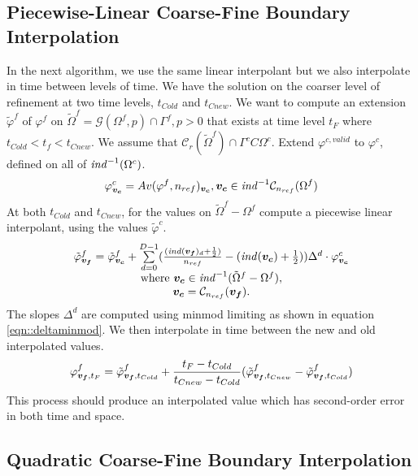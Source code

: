 \subsection{Piecewise-Linear Coarse-Fine Boundary Interpolation}

In the next algorithm, we use the same linear interpolant but we
also interpolate in time between levels of time.  We have
the solution on the coarser level of refinement at two time levels,
$t_{Cold}$ and $t_{Cnew}$.
We want to compute an extension $\tilde{\varphi}^f$ of $\varphi^f$ on
$\tilde{\Omega}^f = \mathcal{G}(\Omega^f, p) \cap \Gamma^f, p>0$ 
that exists at time level $t_{F}$ where $t_{Cold} < t_f < t_{Cnew}$.
We assume that $\mathcal{C}_r(\tilde{\Omega}^f) \cap \Gamma^c C
\Omega^c$. 
Extend $\varphi^{c, valid}$ to $\varphi^c$, defined on all of
${\it ind}^{-1}(\Omega^c)$.
\begin{equation}
\varphi^c_{{\boldsymbol{v_c}}} = Av(\varphi^f, n_{ref})_{{\boldsymbol{v_c}}}, 
{\boldsymbol{v_c}} \in {\it ind}^{-1} \mathcal{C}_{n_{ref}}(\Omega^f) 
\end{equation}
At both $t_{Cold}$ and $t_{Cnew}$, 
for the values on $\tilde{\Omega}^f - \Omega^f$ compute a
piecewise linear interpolant, using the values $\tilde{\varphi}^c$. 
\begin{equation}
\begin{array}{c}
\tilde{\varphi}^f_{{\boldsymbol{v_f}}} = \tilde{\varphi}^f_{{\boldsymbol{v_c}}} +
\sum\limits^{D-1}_{d=0}(\frac{({\it ind}({\boldsymbol{v_f}})_d + \frac{1}{2})}{n_{ref}} -
({\it ind}({\boldsymbol{v_c}}) + \frac{1}{2}))\Delta^d \cdot \varphi^c_{{\boldsymbol{v_c}}} \\
\mbox{where } {\boldsymbol{v_c}} \in {\it ind}^{-1}(\tilde{\Omega}^f - \Omega^f), \\
{\boldsymbol{v_c}}= \mathcal{C}_{n_{ref}}({\boldsymbol{v_f}}). 
\end{array}
\end{equation}
The slopes $\Delta^d$ are computed using minmod limiting as shown
in equation \ref{eqn::deltaminmod}.
We then interpolate  in time between the new and old interpolated
values.
\begin{equation}
{\varphi}^f_{{\boldsymbol{v_f}}, t_F} =  \tilde{\varphi}^f_{{\boldsymbol{v_f}}, t_{Cold}} 
+\frac{t_F - t_{Cold}}{t_{Cnew}-t_{Cold}}
(\tilde{\varphi}^f_{{\boldsymbol{v_f}}, t_{Cnew}}-\tilde{\varphi}^f_{{\boldsymbol{v_f}}, t_{Cold}})
\end{equation}
This process should produce an interpolated value which has
second-order error in both time and space.

\subsection{Quadratic Coarse-Fine Boundary Interpolation}

